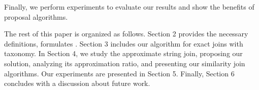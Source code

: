 Finally, we perform experiments to evaluate our results and show the benefits of proposal algorithms.

%
%
%
%



\smallskip

The rest of this paper is organized as follows. Section 2
provides the necessary definitions, formulates . Section
3 includes our algorithm for exact joins with taxonomy. In Section 4, we study
the approximate string join, proposing our solution, analyzing its approximation
ratio, and presenting our similarity join algorithms.
Our experiments are presented in Section 5. Finally,
Section 6 concludes with a discussion about future work.
